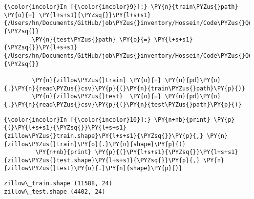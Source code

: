\begin{Verbatim}[commandchars=\\\{\}]
{\color{incolor}In [{\color{incolor}9}]:} \PY{n}{train\PYZus{}path} \PY{o}{=} \PY{l+s+s1}{\PYZsq{}}\PY{l+s+s1}{/Users/hn/Documents/GitHub/job\PYZus{}inventory/Hossein/Code\PYZus{}Question/Zillow/TRAINING.csv}\PY{l+s+s1}{\PYZsq{}}
        \PY{n}{test\PYZus{}path} \PY{o}{=} \PY{l+s+s1}{\PYZsq{}}\PY{l+s+s1}{/Users/hn/Documents/GitHub/job\PYZus{}inventory/Hossein/Code\PYZus{}Question/Zillow/TEST.csv}\PY{l+s+s1}{\PYZsq{}}
        
        \PY{n}{zillow\PYZus{}train} \PY{o}{=} \PY{n}{pd}\PY{o}{.}\PY{n}{read\PYZus{}csv}\PY{p}{(}\PY{n}{train\PYZus{}path}\PY{p}{)}
        \PY{n}{zillow\PYZus{}test}  \PY{o}{=} \PY{n}{pd}\PY{o}{.}\PY{n}{read\PYZus{}csv}\PY{p}{(}\PY{n}{test\PYZus{}path}\PY{p}{)}
\end{Verbatim}



\begin{Verbatim}[commandchars=\\\{\}]
{\color{incolor}In [{\color{incolor}10}]:} \PY{n+nb}{print} \PY{p}{(}\PY{l+s+s1}{\PYZsq{}}\PY{l+s+s1}{zillow\PYZus{}train.shape}\PY{l+s+s1}{\PYZsq{}}\PY{p}{,} \PY{n}{zillow\PYZus{}train}\PY{o}{.}\PY{n}{shape}\PY{p}{)}
         \PY{n+nb}{print} \PY{p}{(}\PY{l+s+s1}{\PYZsq{}}\PY{l+s+s1}{zillow\PYZus{}test.shape}\PY{l+s+s1}{\PYZsq{}}\PY{p}{,} \PY{n}{zillow\PYZus{}test}\PY{o}{.}\PY{n}{shape}\PY{p}{)}
\end{Verbatim}


    \begin{Verbatim}[commandchars=\\\{\}]
zillow\_train.shape (11588, 24)
zillow\_test.shape (4402, 24)

    \end{Verbatim}


\iffalse

